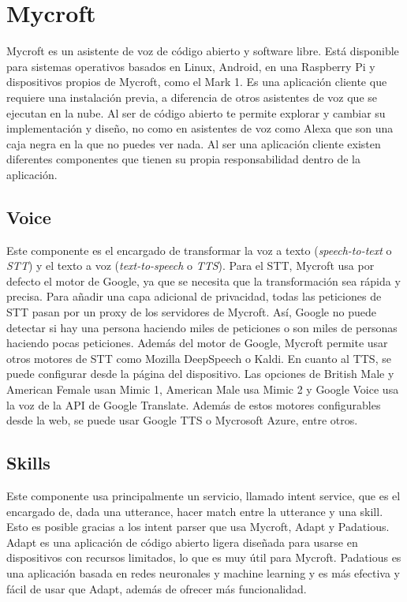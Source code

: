 \section{Mycroft}

Mycroft es un asistente de voz de código abierto y software libre. Está disponible para sistemas operativos basados en Linux, Android, en una Raspberry Pi y dispositivos propios de Mycroft, como el Mark 1. Es una aplicación cliente que requiere una instalación previa, a diferencia de otros asistentes de voz que se ejecutan en la nube. Al ser de código abierto te permite explorar y cambiar su implementación y diseño, no como en asistentes de voz como Alexa que son una caja negra en la que no puedes ver nada. Al ser una aplicación cliente existen diferentes componentes que tienen su propia responsabilidad dentro de la aplicación.

\subsection{Voice}

Este componente es el encargado de transformar la voz a texto (\textit{speech-to-text} o \textit{STT}) y el texto a voz (\textit{text-to-speech} o \textit{TTS}).
Para el STT, Mycroft usa por defecto el motor de Google, ya que se necesita que la transformación sea rápida y precisa. Para añadir una capa adicional de privacidad, todas las peticiones de STT pasan por un proxy de los servidores de Mycroft. Así, Google no puede detectar si hay una persona haciendo miles de peticiones o son miles de personas haciendo pocas peticiones. Además del motor de Google, Mycroft permite usar otros motores de STT como Mozilla DeepSpeech o Kaldi.
En cuanto al TTS, se puede configurar desde la página del dispositivo. Las opciones de British Male y American Female usan Mimic 1, American Male usa Mimic 2 y Google Voice usa la voz de la API de Google Translate. Además de estos motores configurables desde la web, se puede usar Google TTS o Mycrosoft Azure, entre otros.

\subsection{Skills}

Este componente usa principalmente un servicio, llamado intent service, que es el encargado de, dada una utterance, hacer match entre la utterance y una skill. Esto es posible gracias a los intent parser que usa Mycroft, Adapt y Padatious.
Adapt es una aplicación de código abierto ligera diseñada para usarse en dispositivos con recursos limitados, lo que es muy útil para Mycroft. Padatious es una aplicación basada en redes neuronales y machine learning y es más efectiva y fácil de usar que Adapt, además de ofrecer más funcionalidad.

